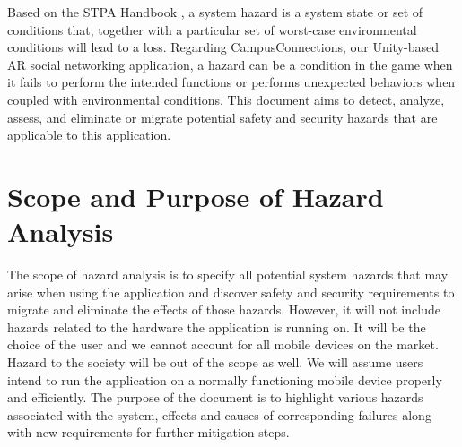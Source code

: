 \documentclass{article}
\begin{document}
Based on the STPA Handbook \cite{STPA}, a system hazard is a system state or set of conditions that, together with a particular set of worst-case environmental conditions will lead to a loss. Regarding CampusConnections, our Unity-based AR social networking application, a hazard can be a condition in the game when it fails to perform the intended functions or performs unexpected behaviors when coupled with environmental conditions. This document aims to detect, analyze, assess, and eliminate or migrate potential safety and security hazards that are applicable to this application. 

\section{Scope and Purpose of Hazard Analysis}

The scope of hazard analysis is to specify all potential system hazards that may arise when using the application and discover safety and security requirements to migrate and eliminate the effects of those hazards. However, it will not include hazards related to the hardware the application is running on. It will be the choice of the user and we cannot account for all mobile devices on the market. Hazard to the society will be out of the scope as well. We will assume users intend to run the application on a normally functioning mobile device properly and efficiently. The purpose of the document is to highlight various hazards associated with the system, effects and causes of corresponding failures along with new requirements for further mitigation steps.
\end{document}
